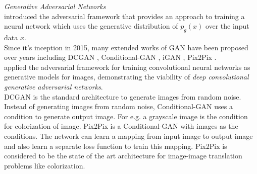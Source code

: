 \documentclass[conference]{IEEEtran}
\begin{document}
\hspace*{0.1 in}\textit{Generative Adversarial Networks}\\
\hspace*{0.25 in}\cite{goodfellow2014generative} introduced the adversarial framework that provides an approach to training a neural network which uses the generative distribution of $p_g(x)$ over the input data $x$.\\
\hspace*{0.25 in}Since it's inception in 2015, many extended works of GAN have been proposed over years including DCGAN \citep{radford2016unsupervised}, Conditional-GAN \citep{mirza2014conditional}, iGAN \citep{zhu2018generative}, Pix2Pix \citep{isola2018imagetoimage}.\\
\hspace*{0.25 in}\cite{radford2016unsupervised} applied the adversarial framework for training convolutional neural networks as generative models for images, demonstrating the viability of \textit{deep convolutional generative adversarial networks}.\\
\hspace*{0.25 in}DCGAN is the standard architecture to generate images from random noise. Instead of generating images from random noise, Conditional-GAN \citep{mirza2014conditional} uses a condition to generate output image. For e.g. a grayscale image is the condition for colorization of image. Pix2Pix \citep{isola2018imagetoimage} is a Conditional-GAN with images as the conditions. The network can learn a mapping from input image to output image and also learn a separate loss function to train this mapping. Pix2Pix is considered to be the state of the art architecture for image-image translation problems like colorization.
\end{document}
